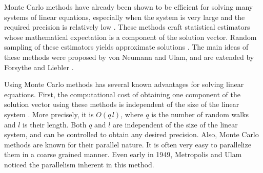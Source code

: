 \documentclass{elsart}
\theoremstyle{remark}
\theoremstyle{definition}
\theoremstyle{proof}
\begin{document}
    Monte Carlo methods have already been shown to be efficient for
    solving many systems of linear equations, especially when the system is
    very large and the required precision is relatively low
    \cite{Tan2002} \cite{Dimov1998} \cite{Alexandrov1998}.  These methods craft
    statistical estimators whose mathematical expectation is a component
    of the solution vector.  Random sampling of these estimators yields
    approximate solutions\cite{Tan2002} \cite{Rubinstein1981}
    \cite{Westlake1968}.
    The main ideas of these methods were proposed by von Neumann and
    Ulam, and are extended by Forsythe and Liebler \cite{Forsythe1950}.
    
    Using Monte Carlo methods has several known advantages for solving
    linear equations.  First, the computational cost of obtaining one
    component of the solution vector using these methods is independent
    of the size of the linear system \cite{Tan2002}.  More precisely, it
    is $O(q\,l)$, where $q$ is the number of random walks and $l$ is
    their length.  Both $q$ and $l$ are independent of the size of the
    linear system, and can be controlled to obtain any desired
    precision.  Also, Monte Carlo methods are known for their
    parallel nature.  It is often very easy to parallelize them in a
    coarse grained manner.  Even early in 1949, Metropolis and Ulam
    \cite{Metropolisand1949} noticed the parallelism inherent in this
    method.
    
\end{document}
